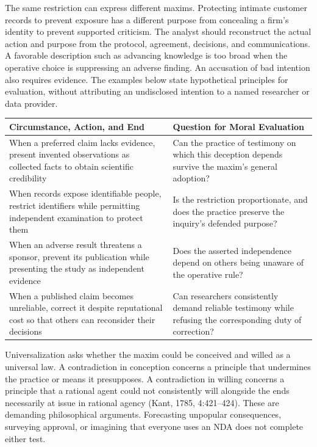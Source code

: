 The same restriction can express different maxims. Protecting intimate
customer records to prevent exposure has a different purpose from
concealing a firm's identity to prevent supported criticism. The analyst
should reconstruct the actual action and purpose from the protocol,
agreement, decisions, and communications. A favorable description such
as advancing knowledge is too broad when the operative choice is
suppressing an adverse finding. An accusation of bad intention also
requires evidence. The examples below state hypothetical principles for
evaluation, without attributing an undisclosed intention to a named
researcher or data provider.

\begin{table}[H]
\centering\small
\begin{tabular}{@{}
  >{\raggedright\arraybackslash}p{}
  >{\raggedright\arraybackslash}p{}@{}}
\toprule
Circumstance, Action, and End & Question for Moral Evaluation \\
\midrule

When a preferred claim lacks evidence, present invented observations as
collected facts to obtain scientific credibility & Can the practice of
testimony on which this deception depends survive the maxim's general
adoption? \\
When records expose identifiable people, restrict identifiers while
permitting independent examination to protect them & Is the restriction
proportionate, and does the practice preserve the inquiry's defended
purpose? \\
When an adverse result threatens a sponsor, prevent its publication
while presenting the study as independent evidence & Does the asserted
independence depend on others being unaware of the operative rule? \\
When a published claim becomes unreliable, correct it despite
reputational cost so that others can reconsider their decisions & Can
researchers consistently demand reliable testimony while refusing the
corresponding duty of correction? \\
\bottomrule
\end{tabular}
\end{table}

Universalization asks whether the maxim could be conceived and willed as
a universal law. A contradiction in conception concerns a principle that
undermines the practice or means it presupposes. A contradiction in
willing concerns a principle that a rational agent could not
consistently will alongside the ends necessarily at issue in rational
agency (Kant, 1785, 4:421--424). These are demanding philosophical
arguments. Forecasting unpopular consequences, surveying approval, or
imagining that everyone uses an NDA does not complete either test.

